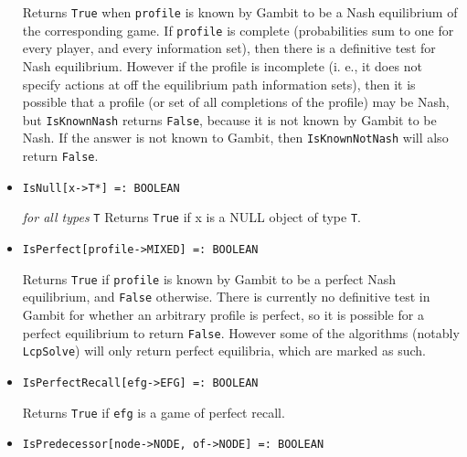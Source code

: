 \begin{itemize}
\bd
{}
Returns \verb+True+ when \verb+profile+
is known by Gambit to be a Nash equilibrium of the
corresponding game.  If \verb+profile+ is complete (probabilities sum to
one for every player, and every information set), then there is a
definitive test for Nash equilibrium.  However if the profile is
incomplete (i. e., it does not specify actions at off the equilibrium
path information sets), then it is possible that a profile (or set
of all completions of the profile) may be Nash, but \verb+IsKnownNash+
returns \verb+False+, because it is not known by Gambit to be Nash.
If the answer is not known to Gambit, then \verb+IsKnownNotNash+ will also
return \verb+False+.
\ed

\item{}
\protect \large \begin{verbatim}
IsNull[x->T*] =: BOOLEAN 
\end{verbatim}\normalsize

{\it for all types} {\tt T}
\bd
Returns \verb+True+ if x is a NULL object of type \verb+T+.  
\ed

\item{}
\protect \large \begin{verbatim}
IsPerfect[profile->MIXED] =: BOOLEAN 
\end{verbatim}\normalsize

\bd 
{}
Returns \verb+True+ if \verb+profile+
is known by Gambit to be a perfect Nash equilibrium, and \verb+False+
otherwise.  There is currently no definitive test in Gambit for
whether an arbitrary profile is perfect, so it is possible for a
perfect equilibrium to return \verb+False+.  However some of the
algorithms (notably \verb+LcpSolve+) will only return perfect
equilibria, which are marked as such.  
\ed

\item{}
\protect \large \begin{verbatim}
IsPerfectRecall[efg->EFG] =: BOOLEAN 
\end{verbatim}\normalsize

\bd 
Returns \verb+True+ if \verb+efg+ is a game of perfect recall.
\ed


\item{}
\protect \large \begin{verbatim}
IsPredecessor[node->NODE, of->NODE] =: BOOLEAN 
\end{verbatim}\normalsize


\end{itemize}
